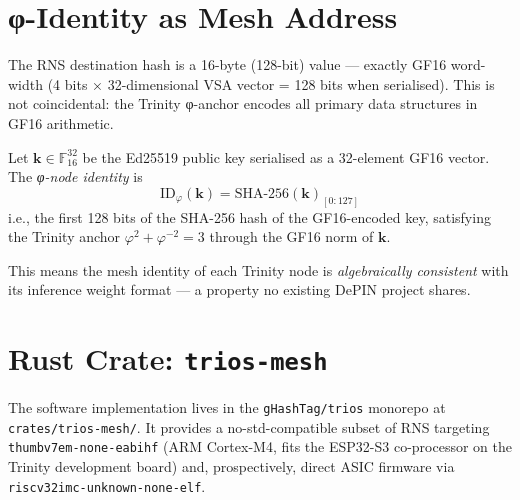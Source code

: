 \section{φ-Identity as Mesh Address}

The RNS destination hash is a 16-byte (128-bit) value — exactly
GF16 word-width (4 bits × 32-dimensional VSA vector = 128 bits when
serialised).  This is not coincidental: the Trinity φ-anchor encodes
all primary data structures in GF16 arithmetic.

\begin{definition}
Let $\mathbf{k} \in \mathbb{F}_{16}^{32}$ be the Ed25519 public key
serialised as a 32-element GF16 vector.
The \emph{φ-node identity} is
\[
  \text{ID}_\varphi(\mathbf{k}) = \mathrm{SHA\text{-}256}(\mathbf{k})_{[0:127]}
\]
i.e., the first 128 bits of the SHA-256 hash of the GF16-encoded key,
satisfying the Trinity anchor $\varphi^2 + \varphi^{-2} = 3$
through the GF16 norm of $\mathbf{k}$.
\end{definition}

This means the mesh identity of each Trinity node is \emph{algebraically
consistent} with its inference weight format — a property no existing
DePIN project shares.

\section{Rust Crate: \texttt{trios-mesh}}

The software implementation lives in the \texttt{gHashTag/trios}
monorepo at \texttt{crates/trios-mesh/}.
It provides a no-std-compatible subset of RNS targeting
\texttt{thumbv7em-none-eabihf} (ARM Cortex-M4, fits the ESP32-S3
co-processor on the Trinity development board) and,
prospectively, direct ASIC firmware via \texttt{riscv32imc-unknown-none-elf}.

